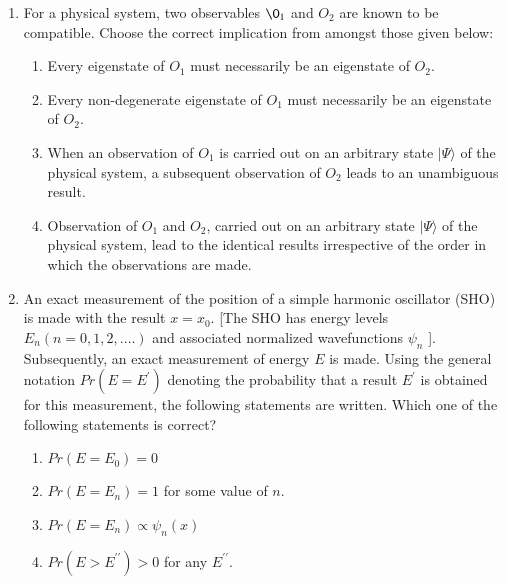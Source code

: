 \documentclass[journal]{IEEEtran}
\begin{document}
\begin{enumerate}
      

    \item For a physical system, two observables $\O_{1}$ and $O_{2}$ are known to be compatible. Choose the correct implication from amongst those given below:
		
			\begin{enumerate}
	\item Every eigenstate of ${O}_{1}$ must necessarily be an eigenstate of ${O}_{2}$.
\item Every non-degenerate eigenstate of ${O}_{1}$ must necessarily be an eigenstate of ${O}_{2}$.
\item When an observation of $O_{1}$ is carried out on an arbitrary state $|\Psi\rangle$ of the physical system, a subsequent observation of ${O}_{2}$ leads to an unambiguous result.
\item Observation of ${O}_{1}$ and ${O}_{2}$, carried out on an arbitrary state $|\Psi\rangle$ of the physical system, lead to the identical results irrespective of the order in which the observations are made.
	\end{enumerate}
		

    \item An exact measurement of the position of a simple harmonic oscillator (SHO) is made with the result $x=x_{0}$. [The SHO has energy levels $E_{n}(n=0,1,2, ....)$ and associated normalized wavefunctions $\psi_{n}$ ]. Subsequently, an exact measurement of energy $E$ is made. Using the general notation ${Pr}\left(E=E^{\prime}\right)$ denoting the probability that a result $E^{\prime}$ is obtained for this measurement, the following statements are written. Which one of the following statements is correct?
		\begin{multicols}{1}
			\begin{enumerate}
				
	\item ${Pr}\left(E=E_{0}\right)=0$
\item ${Pr}\left(E=E_{n}\right)=1$ for some value of $n$.
\item ${Pr}\left(E=E_{n}\right) \propto \psi_{{n}}(x)$
\item ${Pr}\left(E>E^{\prime \prime}\right)>0$ for any $E^{\prime \prime}$.
			\end{enumerate}
		\end{multicols}


\end{enumerate}
\end{document}
